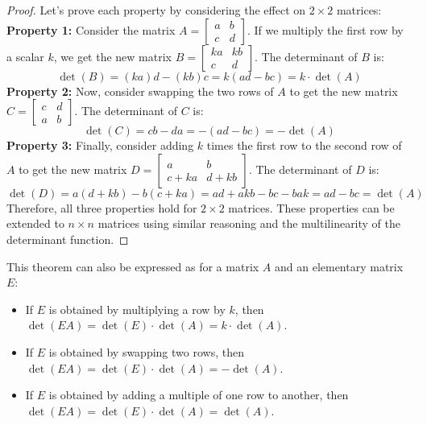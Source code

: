 \begin{proof}
    Let's prove each property by considering the effect on $2 \times 2$ matrices: \\
    \textbf{Property 1:} Consider the matrix \(A = \begin{bmatrix}
        a & b \\
        c & d
    \end{bmatrix}\). If we multiply the first row by a scalar \(k\), we get the new matrix \(B = \begin{bmatrix}
        ka & kb \\
        c & d
    \end{bmatrix}\). The determinant of \(B\) is:
    \[
        \det(B) = (ka)d - (kb)c = k(ad - bc) = k \cdot \det(A)
    \]
    \textbf{Property 2:} Now, consider swapping the two rows of \(A\) to get the new matrix \(C = \begin{bmatrix}
        c & d \\
        a & b
    \end{bmatrix}\). The determinant of \(C\) is:
    \[
        \det(C) = cb - da = -(ad - bc) = -\det(A)
    \]
    \textbf{Property 3:} Finally, consider adding \(k\) times the first row to the second row of \(A\) to get the new matrix \(D = \begin{bmatrix}
        a & b \\
        c + ka & d + kb
    \end{bmatrix}\). The determinant of \(D\) is:
    \[
        \det(D) = a(d + kb) - b(c + ka) = ad + akb - bc - bak = ad - bc = \det(A)
    \]
    Therefore, all three properties hold for \(2 \times 2\) matrices. These properties can be extended to \(n \times n\) matrices using similar reasoning and the multilinearity of the determinant function.
\end{proof}
This theorem can also be expressed as for a matrix $A$ and an elementary matrix $E$:
\begin{itemize}[itemsep=1pt,label=$\circ$]
    \item If \(E\) is obtained by multiplying a row by \(k\), then \(\det(EA) = \det(E) \cdot \det(A) = k \cdot \det(A)\).
    \item If \(E\) is obtained by swapping two rows, then \(\det(EA) = \det(E) \cdot \det(A) = -\det(A)\).
    \item If \(E\) is obtained by adding a multiple of one row to another, then \(\det(EA) = \det(E) \cdot \det(A) = \det(A)\).
\end{itemize}

